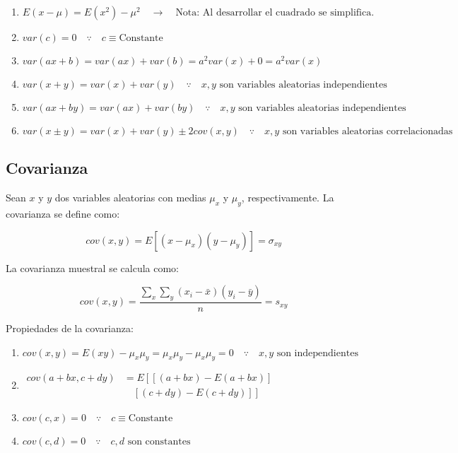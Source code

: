 \documentclass[
]{book}
\providecommand{\tightlist}{%
  \setlength{\itemsep}{0pt}\setlength{\parskip}{0pt}}
\begin{document}
\begin{enumerate}
\def\labelenumi{\arabic{enumi}.}
\tightlist
\item
  \(E(x-\mu) = E(x^2) - \mu^2 \quad \rightarrow \quad \text{Nota: Al desarrollar el cuadrado se simplifica.}\)
\item
  \(var(c)=0 \quad \because \quad c \equiv \text{Constante}\)
\item
  \(var(ax + b) = var(ax) + var(b) = a^2 var(x) + 0 = a^2 var(x)\)
\item
  \(var(x+y) = var(x) + var(y) \quad \because \quad x,y \text{ son variables aleatorias independientes}\)
\item
  \(var(ax + by) = var(ax) + var(by) \quad \because \quad x,y \text{ son variables aleatorias independientes}\)
\item
  \(var(x \pm y) = var(x) + var(y) \pm 2cov(x,y) \quad \because \quad x,y \text{ son variables aleatorias correlacionadas}\)
\end{enumerate}

\hypertarget{covarianza}{%
\subsection{Covarianza}\label{covarianza}}

Sean \(x\) y \(y\) dos variables aleatorias con medias \(\mu_x\) y \(\mu_y\), respectivamente. La covarianza se define como:

\[
cov(x,y) = E[(x-\mu_x)(y-\mu_y)] = \sigma_{xy}
\]

La covarianza muestral se calcula como:

\[
cov(x,y) = \frac{\sum_x \sum_y (x_i - \bar x)(y_i - \bar y)}{n} = s_{xy}
\]

Propiedades de la covarianza:

\begin{enumerate}
\def\labelenumi{\arabic{enumi}.}
\tightlist
\item
  \(cov(x,y) = E(xy) - \mu_x \mu_y = \mu_x \mu_y - \mu_x \mu_y = 0 \quad \because \quad x,y \text{ son independientes}\)
\item
  \(\begin{aligned} cov(a+bx, c+dy) &= E\left[ \left[(a+bx) - E(a+bx)\right]\right. \\ &\left.\quad \left[(c+dy) - E(c+dy)\right] \right] \end{aligned}\)
\item
  \(cov(c,x) = 0 \quad \because \quad c \equiv \text{Constante}\)
\item
  \(cov(c,d) = 0 \quad \because \quad c,d \text{ son constantes}\)
\end{enumerate}
\end{document}
